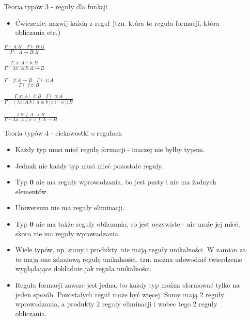 \documentclass{beamer}
\newcommand{\U}{\mathcal{U}}
\begin{document}
\begin{frame}{Teoria typów 3 - reguły dla funkcji}

\begin{itemize}
	\item Ćwiczenie: nazwij każdą z reguł (tzn. która to reguła formacji, która obliczania etc.)
\end{itemize}

\begin{center}
	$\displaystyle \frac{\Gamma \vdash A : \U \quad \Gamma \vdash B : \U}{\Gamma \vdash A \to B : \U}$
\end{center}
\begin{center}
	$\displaystyle \frac{\Gamma, x : A \vdash b : B}{\Gamma \vdash \lambda x:A.b : A \to B}$
\end{center}
\begin{center}
	$\displaystyle \frac{\Gamma \vdash f : A \to B \quad \Gamma \vdash x : A}{\Gamma \vdash f\ x : B}$
\end{center}
\begin{center}
	$\displaystyle \frac{\Gamma, x : A \vdash b : B \quad \Gamma \vdash a : A}{\Gamma \vdash (\lambda x:A.b)\ a \equiv b[x := a] : B}$
\end{center}
\begin{center}
	$\displaystyle \frac{\Gamma \vdash f : A \to B}{\Gamma \vdash \lambda x:A.f\ x \equiv f : A \to B}$
\end{center}

\end{frame}

\begin{frame}{Teoria typów 4 - ciekawostki o regułach}
\begin{itemize}
	\item Każdy typ musi mieć regułę formacji - inaczej nie byłby typem.
	\item Jednak nie każdy typ musi mieć pozostałe reguły.
	\item Typ $\mathbf{0}$ nie ma reguły wprowadzania, bo jest pusty i nie ma żadnych elementów.
	\item Uniwersum nie ma reguły eliminacji.
	\item Typ $\mathbf{0}$ nie ma także reguły obliczania, co jest oczywiste - nie może jej mieć, skoro nie ma reguły wprowadzania.
	\item Wiele typów, np. sumy i produkty, nie mają reguły unikalności. W zamian za to mają one zdaniową regułę unikalności, tzn. można udowodnić twierdzenie wyglądające dokładnie jak reguła unikalności.
	\item Reguła formacji zawsze jest jedna, bo każdy typ można sformować tylko na jeden sposób. Pozostałych reguł może być więcej. Sumy mają 2 reguły wprowadzania, a produkty 2 reguły eliminacji i wobec tego 2 reguły obliczania.
\end{itemize}
\end{frame}
\end{document}
